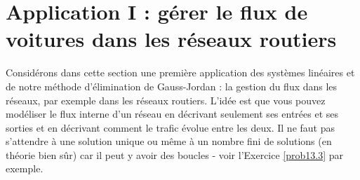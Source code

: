\section{Application I : gérer le flux de voitures dans les réseaux routiers}

Considérons dans cette section une première application des systèmes linéaires et de
notre méthode d'élimination de Gauss-Jordan : la gestion du flux dans les réseaux, par exemple dans les r\'eseaux routiers.  
L'idée est que vous pouvez modéliser le flux interne d'un réseau en décrivant seulement
ses entrées et ses sorties et en décrivant comment le trafic évolue entre les deux.  
Il ne faut pas s'attendre à une solution unique ou même à un nombre fini de solutions (en théorie bien sûr) car il peut y avoir des boucles - voir l'Exercice \ref{prob13.3} par exemple.

